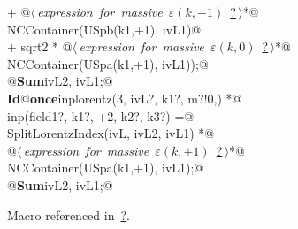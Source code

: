 \documentclass[a4paper,12pt]{amsart}
\renewcommand{\NWlink}[2]{\hyperlink{#1}{#2}}
\renewcommand{\NWtxtMacroRefIn}{Macro referenced in}
\renewcommand{\NWsep}{${\diamond}$}
\begin{document}
\begin{flushleft}
\begin{minipage}{\linewidth}
\begin{list}{}{}
\mbox{}\verb@   + @\hbox{$\langle\,${\it expression for massive $\varepsilon(k, +1)$}\nobreak\ {\footnotesize \NWlink{nuweb?}{?}}$\,\rangle$}\verb@ *@\\
\mbox{}\verb@     NCContainer(USpb(k1,+1), ivL1)@\\
\mbox{}\verb@   + sqrt2 * @\hbox{$\langle\,${\it expression for massive $\varepsilon(k, 0)$}\nobreak\ {\footnotesize \NWlink{nuweb?}{?}}$\,\rangle$}\verb@ *@\\
\mbox{}\verb@     NCContainer(USpa(k1,+1), ivL1));@\\
\mbox{}\verb@   @\hbox{\sffamily\bfseries Sum}\verb@ ivL2, ivL1;@\\
\mbox{}\verb@@\hbox{\sffamily\bfseries Id}\verb@ @\hbox{\sffamily\bfseries once}\verb@ inplorentz(3, ivL?, k1?, m?!{0,}) *@\\
\mbox{}\verb@      inp(field1?, k1?, +2, k2?, k3?) =@\\
\mbox{}\verb@   SplitLorentzIndex(ivL, ivL2, ivL1) *@\\
\mbox{}\verb@   @\hbox{$\langle\,${\it expression for massive $\varepsilon(k, +1)$}\nobreak\ {\footnotesize \NWlink{nuweb?}{?}}$\,\rangle$}\verb@ *@\\
\mbox{}\verb@   NCContainer(USpa(k1,+1), ivL1);@\\
\mbox{}\verb@   @\hbox{\sffamily\bfseries Sum}\verb@ ivL2, ivL1;@\\
\mbox{}\verb@@{\NWsep}
\end{list}
\vspace{-1.5ex}
\footnotesize
\begin{list}{}{\setlength{\itemsep}{-\parsep}\setlength{\itemindent}{-\leftmargin}}
\item \NWtxtMacroRefIn\ \NWlink{nuweb?}{?}.

\item{}
\end{list}
\end{minipage}\vspace{4ex}
\end{flushleft}
\end{document}
